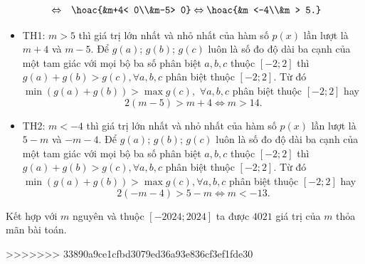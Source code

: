 \begin{ex}
{\begin{eqnarray*}
			&\Leftrightarrow& \hoac{&m+4< 0\\&m-5> 0} \Leftrightarrow \hoac{&m <-4\\&m > 5.}			
		\end{eqnarray*}		
		\begin{itemize}
			\item TH1: $m>5$ thì giá trị lớn nhất và nhỏ nhất của hàm số $p(x)$ lần lượt là $m+4$ và $m-5$.	Để $g(a);\,g(b);\,g(c)$ luôn là số đo độ dài ba cạnh của một tam giác với mọi bộ ba số phân biệt $a,b,c$ thuộc $[-2;2]$ thì $g(a)+g(b) > g(c),\forall a,b,c$ phân biệt thuộc $[-2;2]$. Từ đó $\min \left(g(a)+g(b)\right) > \max g(c),\,\,\forall a,b,c$ phân biệt thuộc $[-2;2]$ 
			hay \[2\left(m-5\right) > m+4\Leftrightarrow m > 14.\]
			\item TH2:  $m<-4$ thì giá trị lớn nhất và nhỏ nhất của hàm số $p(x)$ lần lượt là $5-m$ và $-m-4$.	Để $g(a)$; $g(b)$; $g(c)$ luôn là số đo độ dài ba cạnh của một tam giác với mọi bộ ba số phân biệt $a,b,c$ thuộc $[-2;2]$ thì $g(a)+g(b) > g(c),\forall a,b,c$ phân biệt thuộc $[-2;2]$. Từ đó $\min \left(g(a)+g(b)\right) > \max g(c),\forall a,b,c$ phân biệt thuộc $[-2;2]$
			hay \[2\left(-m-4\right) > 5-m\Leftrightarrow m <-13.\]
		\end{itemize}		
		Kết hợp với $m$ nguyên và thuộc $[-2024;2024]$ ta được $4021$ giá trị của $m$ thỏa mãn bài toán.
	}
\end{ex}



%
>>>>>>> 33890a9ce1cfbd3079ed36a93e836cf3ef1fde30
